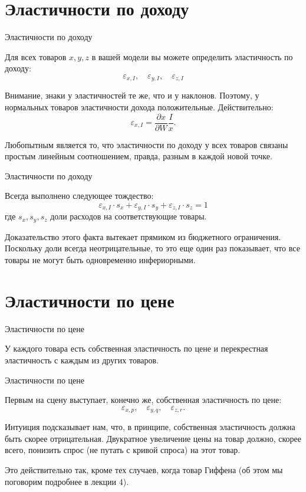 \documentclass{beamer}
\begin{document}
\section{Эластичности по доходу}

\begin{frame}{Эластичности по доходу}

Для всех товаров $x,y,z$ в вашей модели вы можете определить эластичность по доходу:
$$\varepsilon_{x,I}, \quad \varepsilon_{y,I}, \quad \varepsilon_{z,I}$$

Внимание, \alert{знаки у эластичностей те же, что и у наклонов}. Поэтому, у нормальных товаров эластичности дохода положительные. Действительно:
$$\varepsilon_{x,I} = \frac{\partial x}{\partial W} \frac{I}{x}.$$

Любопытным является то, что эластичности по доходу у всех товаров связаны простым линейным соотношением, правда, разным в каждой новой точке.

\end{frame}

\begin{frame}{Эластичности по доходу}

\begin{lemma}
Всегда выполнено следующее тождество:
$$\varepsilon_{x,I} \cdot s_x + \varepsilon_{y,I} \cdot s_y + \varepsilon_{z,I} \cdot s_z = 1$$
где $s_x, s_y, s_z$ доли расходов на соответствующие товары.
\end{lemma}

Доказательство этого факта вытекает прямиком из бюджетного ограничения. Поскольку доли всегда неотрицательные, то это еще один раз показывает, что \alert{все товары не могут быть одновременно инфериорными}.

\end{frame}

\section{Эластичности по цене}

\begin{frame}{Эластичности по цене}

У каждого товара есть \alert{собственная эластичность} по цене и \alert{перекрестная эластичность} с каждым из других товаров. 

\end{frame}

\begin{frame}{Эластичности по цене}

Первым на сцену выступает, конечно же, собственная эластичность по цене:
$$\varepsilon_{x,p}, \quad \varepsilon_{y,q}, \quad \varepsilon_{z,r}.$$

Интуиция подсказывает нам, что, в принципе, собственная эластичность должна быть скорее отрицательная. Двукратное увеличение цены на товар должно, скорее всего, понизить спрос (не путать с кривой спроса) на этот товар. 

Это действительно так, кроме тех случаев, когда товар Гиффена (об этом мы поговорим подробнее в лекции 4).

\end{frame}
\end{document}

